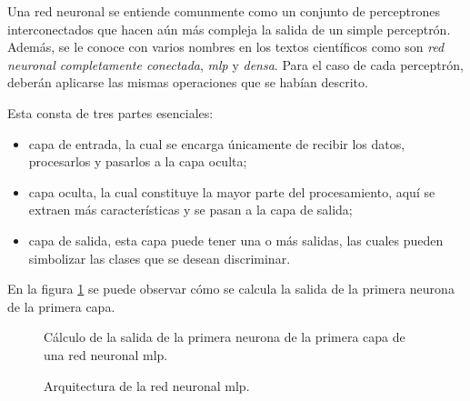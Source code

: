 \par Una red neuronal se entiende comunmente como un conjunto de perceptrones interconectados que hacen aún más compleja la salida de un simple perceptrón. Además, se le conoce con varios nombres en los textos científicos como son \textit{red neuronal completamente conectada}, \textit{\gls{mlp}} y \textit{densa}. Para el caso de cada perceptrón, deberán aplicarse las mismas operaciones que se habían descrito. 
\par Esta consta de tres partes esenciales: 
	\begin{itemize}
		\item capa de entrada, la cual se encarga únicamente de recibir los datos, procesarlos y pasarlos a la capa oculta;
		\item capa oculta, la cual constituye la mayor parte del procesamiento, aquí se extraen más características y se pasan a la capa de salida;
		\item  capa de salida, esta capa puede tener una o más salidas, las cuales pueden simbolizar las clases que se desean discriminar.
	\end{itemize}

\par En la figura \ref{fig:redneuronal1} se puede observar cómo se calcula la salida de la primera neurona de la primera capa.

\begin{figure}[H]
	\centering
	
	\caption{Cálculo de la salida de la primera neurona de la primera capa de una red neuronal \gls{mlp}.}
	\label{fig:redneuronal1}
\end{figure}


\begin{figure}
	\centering
	
	\caption{Arquitectura de la red neuronal \gls{mlp}.}
	\label{fig:redneuronal}
\end{figure}

